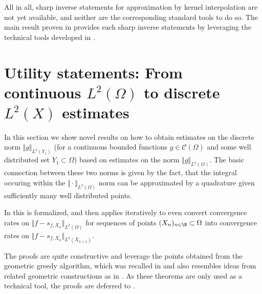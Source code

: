 \documentclass[a4paper, 10pt]{article}
\begin{document}
All in all, sharp inverse statements for approximation by kernel interpolation are not yet available, 
and neither are the corresponding standard tools to do so.
The main result  proven in  provides such sharp inverse statements by leveraging the technical tools developed in .

%




%
%
%
%
%
%
%
%
%
%
%
%
%
%
%
%
%
%

%
%
%
%


%
%




%



%
%
%
%
%
%
%
%
%
%
%
%
%
%
%
%
%
%
%
%
%
%
%
%
%
%
%
%
%
%
%
%
%
%
%
%
%
%
%
%
%
%
%
%
%
%
%
%
%
%
%
%
%
%
%
%
%
%
%
%
%
%
%
%
%
%
%
%
%
%
%




%
%
%
%
%
%
%
%
%
%
%
%
%
%
%




\section{Utility statements: From continuous $L^2(\Omega)$ to discrete $L^2(X)$ estimates}
\label{sec:utility_statements}

%

In this section we show novel results on how to obtain estimates on the discrete norm $\Vert g \Vert_{L^2(Y_1)}$ (for a continuous bounded functions $g \in \mathcal{C}(\Omega)$ and some well distributed set $Y_1 \subset \Omega$) based on estimates on the norm $\Vert g \Vert_{L^2(\Omega)}$.
%
The basic connection between these two norms is given by the fact, that the integral occuring within the $\Vert \cdot \Vert_{L^2(\Omega)}$ norm can be approximated by a quadrature given sufficiently many well distributed points.

In  this is formalized, 
and then  applies  iteratively to even convert convergence rates on $\Vert f - s_{f, X_n} \Vert_{L^2(\Omega)}$ for sequences of points $(X_n)_{n \in \N} \subset \Omega$ into convergence rates on $\Vert f - s_{f, X_n} \Vert_{L^2(X_{n+1})}$.
%
%

The proofs are quite constructive and leverage the points obtained from the geometric greedy algorithm, which was recalled in  and also resembles ideas from related geometric constructions as in
\cite{duchon1978erreur, rieger2008sampling, rieger2010sampling}.
As these theorems are only used as a technical tool, the proofs are deferred to .
\end{document}
